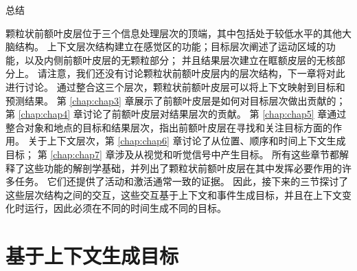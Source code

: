 总结

颗粒状前额叶皮层位于三个信息处理层次的顶端，其中包括处于较低水平的其他大脑结构。
上下文层次结构建立在感觉区的功能；目标层次阐述了运动区域的功能，以及内侧前额叶皮层的无颗粒部分；
并且结果层次建立在眶额皮层的无核部分上。
请注意，我们还没有讨论颗粒状前额叶皮层内的层次结构，下一章将对此进行讨论。
通过整合这三个层次，颗粒状前额叶皮层可以将上下文映射到目标和预测结果。
第 \ref{chap:chap3} 章展示了前额叶皮层是如何对目标层次做出贡献的；
第 \ref{chap:chap4} 章讨论了前额叶皮层对结果层次的贡献。
第 \ref{chap:chap5} 章通过整合对象和地点的目标和结果层次，指出前额叶皮层在寻找和关注目标方面的作用。
关于上下文层次，第 \ref{chap:chap6} 章讨论了从位置、顺序和时间上下文生成目标；
第 \ref{chap:chap7} 章涉及从视觉和听觉信号中产生目标。
所有这些章节都解释了这些功能的解剖学基础，并列出了颗粒状前额叶皮层在其中发挥必要作用的许多任务。
它们还提供了活动和激活通常一致的证据。
因此，接下来的三节探讨了这些层次结构之间的交互，这些交互基于上下文和事件生成目标，并且在上下文变化时运行，因此必须在不同的时间生成不同的目标。



\section{基于上下文生成目标}

